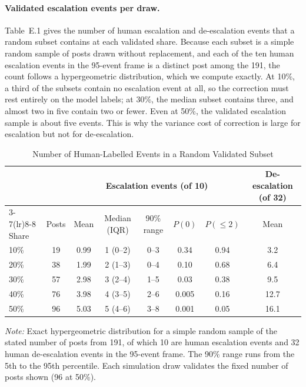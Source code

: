 \documentclass[11pt]{article}
\begin{document}
\paragraph{Validated escalation events per draw.} Table~E.1 gives the number of human escalation and de-escalation events that a random subset contains at each validated share. Because each subset is a simple random sample of posts drawn without replacement, and each of the ten human escalation events in the 95-event frame is a distinct post among the 191, the count follows a hypergeometric distribution, which we compute exactly. At 10\%, a third of the subsets contain no escalation event at all, so the correction must rest entirely on the model labels; at 30\%, the median subset contains three, and almost two in five contain two or fewer. Even at 50\%, the validated escalation sample is about five events. This is why the variance cost of correction is large for escalation but not for de-escalation.

\begin{table}[h]
\centering
\small
\caption{Number of Human-Labelled Events in a Random Validated Subset}
\label{tab:valcount}
\begin{tabular}{lccccccc}
\toprule
 & & \multicolumn{5}{c}{Escalation events (of 10)} & De-escalation (of 32) \\
\cmidrule(lr){3-7}\cmidrule(lr){8-8}
Share & Posts & Mean & Median (IQR) & 90\% range & $P(0)$ & $P(\leq 2)$ & Mean \\
\midrule
10\% & 19 & 0.99 & 1 (0--2) & 0--3 & 0.34 & 0.94 & 3.2 \\
20\% & 38 & 1.99 & 2 (1--3) & 0--4 & 0.10 & 0.68 & 6.4 \\
30\% & 57 & 2.98 & 3 (2--4) & 1--5 & 0.03 & 0.38 & 9.5 \\
40\% & 76 & 3.98 & 4 (3--5) & 2--6 & 0.005 & 0.16 & 12.7 \\
50\% & 96 & 5.03 & 5 (4--6) & 3--8 & 0.001 & 0.05 & 16.1 \\
\bottomrule
\end{tabular}

\vspace{0.5em}
\begin{minipage}{0.95\textwidth}
\footnotesize\textit{Note:} Exact hypergeometric distribution for a simple random sample of the stated number of posts from 191, of which 10 are human escalation events and 32 human de-escalation events in the 95-event frame. The 90\% range runs from the 5th to the 95th percentile. Each simulation draw validates the fixed number of posts shown (96 at 50\%).
\end{minipage}
\end{table}
\end{document}
